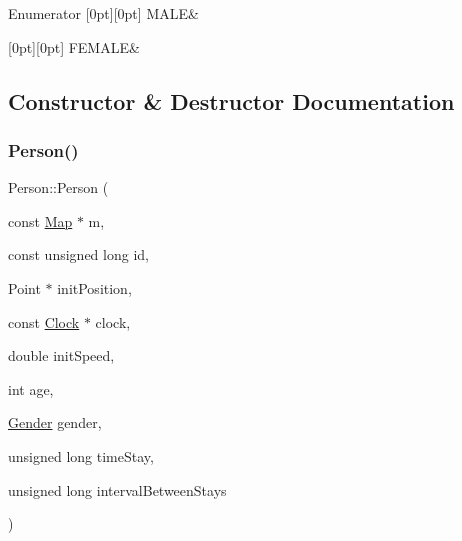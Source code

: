 \begin{DoxyEnumFields}{Enumerator}
[0pt][0pt]{}\mbox{\label{class_person_aff84ca16bd4dbf364614d86f20b29dd2a16691f7cc6595f87b71d9b43ad23fcb4}} 
M\+A\+LE&\\
\hline

[0pt][0pt]{}\mbox{\label{class_person_aff84ca16bd4dbf364614d86f20b29dd2a8ee21010fb2d8e8794ef72be368da064}} 
F\+E\+M\+A\+LE&\\
\hline

\end{DoxyEnumFields}


\subsection{Constructor \& Destructor Documentation}
\mbox{\label{class_person_a1fb64d7ef7c528d01dd09b2099b00e38}} 
\subsubsection{\texorpdfstring{Person()}{Person()}}
{\footnotesize\ttfamily Person\+::\+Person (\begin{DoxyParamCaption}\item[{const \hyperlink{class_map}{Map} $\ast$}]{m,  }\item[{const unsigned long}]{id,  }\item[{Point $\ast$}]{init\+Position,  }\item[{const \hyperlink{class_clock}{Clock} $\ast$}]{clock,  }\item[{double}]{init\+Speed,  }\item[{int}]{age,  }\item[{\hyperlink{class_person_aff84ca16bd4dbf364614d86f20b29dd2}{Gender}}]{gender,  }\item[{unsigned long}]{time\+Stay,  }\item[{unsigned long}]{interval\+Between\+Stays }\end{DoxyParamCaption})\hspace{0.3cm}{\ttfamily [explicit]}}

